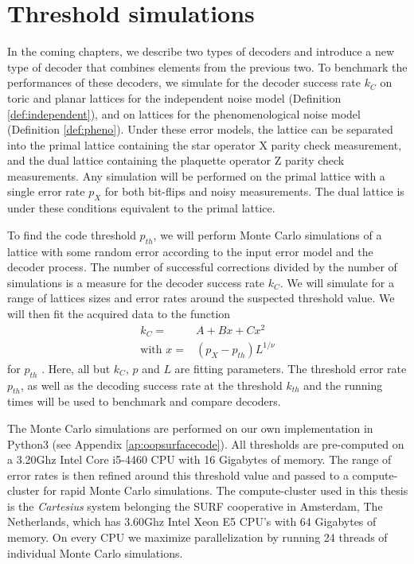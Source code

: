 \section{Threshold simulations}\label{sec:simthres}

In the coming chapters, we describe two types of decoders and introduce a new type of decoder that combines elements from the previous two. To benchmark the performances of these decoders, we simulate for the decoder success rate $k_C$ on toric and planar lattices for the independent noise model (Definition \ref{def:independent}), and on lattices for the phenomenological noise model (Definition \ref{def:pheno}). Under these error models, the lattice can be separated into the primal lattice containing the star operator X parity check measurement, and the dual lattice containing the plaquette operator Z parity check measurements. Any simulation will be performed on the primal lattice with a single error rate $p_X$ for both bit-flips and noisy measurements. The dual lattice is under these conditions equivalent to the primal lattice. 

To find the code threshold $p_{th}$, we will perform Monte Carlo simulations of a lattice with some random error according to the input error model and the decoder process. The number of successful corrections divided by the number of simulations is a measure for the decoder success rate $k_C$. We will simulate for a range of lattices sizes and error rates around the suspected threshold value. We will then fit the acquired data to the function
\begin{align}\label{eq.4.fit}
  \nonumber k_{C} =& A + Bx + Cx^2 \\
  \text{with } x =& (p_X - p_{th})L^{1/\nu}
\end{align}
for $p_{th}$ \cite{wang2003confinement}. Here, all but $k_{C}$, $p$ and $L$ are fitting parameters. The threshold error rate $p_{th}$, as well as the decoding success rate at the threshold $k_{th}$ and the running times will be used to benchmark and compare decoders. 

The Monte Carlo simulations are performed on our own implementation in Python3 (see Appendix \ref{ap:oopsurfacecode}). All thresholds are pre-computed on a 3.20Ghz Intel Core i5-4460 CPU with 16 Gigabytes of memory. The range of error rates is then refined around this threshold value and passed to a compute-cluster for rapid Monte Carlo simulations. The compute-cluster used in this thesis is the \emph{Cartesius} system belonging the SURF cooperative in Amsterdam, The Netherlands, which has 3.60Ghz Intel Xeon E5 CPU's with 64 Gigabytes of memory. On every CPU we maximize parallelization by running 24 threads of individual Monte Carlo simulations. 

